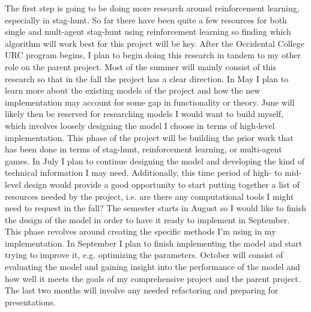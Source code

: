 \documentclass[10pt,twocolumn]{article}
\begin{document}
The first step is going to be doing more research around reinforcement learning, especially in stag-hunt.
So far there have been quite a few resources for both single and mult-agent stag-hunt using reinforcement learning so finding which algorithm will work best for this project will be key.
After the Occidental College URC program begins, I plan to begin doing this research in tandem to my other role on the parent project.
Most of the summer will mainly consist of this research so that in the fall the project has a clear direction.
In May I plan to learn more about the existing models of the project and how the new implementation may account for some gap in functionality or theory.
June will likely then be reserved for researching models I would want to build myself, which involves loosely designing the model I choose in terms of high-level implementation.
This phase of the project will be building the prior work that has been done in terms of stag-hunt, reinforcement learning, or multi-agent games.
In July I plan to continue designing the model and developing the kind of technical information I may need.
Additionally, this time period of high- to mid-level design would provide a good opportunity to start putting together a list of resources needed by the project, i.e. are there any computational tools I might need to request in the fall?
The semester starts in August so I would like to finish the design of the model in order to have it ready to implement in September.
This phase revolves around creating the specific methods I'm using in my implementation.
In September I plan to finish implementing the model and start trying to improve it, e.g. optimizing the parameters.
October will consist of evaluating the model and gaining insight into the performance of the model and how well it meets the goals of my comprehensive project and the parent project.
The last two months will involve any needed refactoring and preparing for presentations.


\printbibliography
\end{document}
